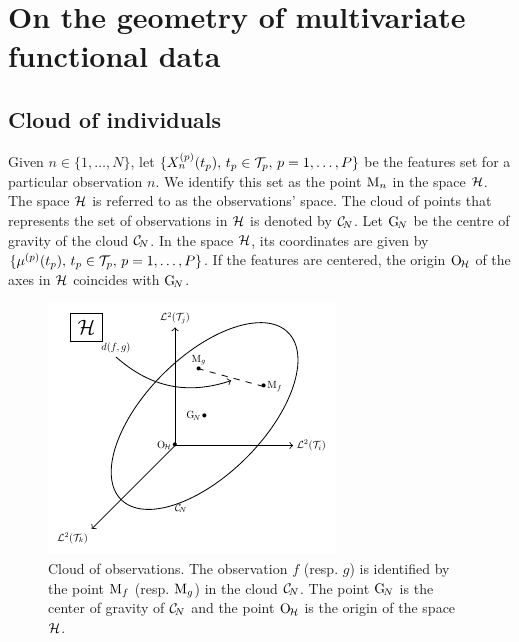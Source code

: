 \section{On the geometry of multivariate functional data} %
\label{sec:geometric_point_of_view_mfpca}

\subsection{Cloud of individuals} %
\label{sub:cloud_of_individuals}

Given $n \in \{1, \dots, N\}$, let $\{X_n^{(p)}(t_p),\,t_p \in \mathcal{T}_{p},\,p = 1, \dots, P\}$ be the features set for a particular observation $n$. We identify this set as the point $\mathrm{M}_n$ in the space $\mathcal{H}$. The space $\mathcal{H}$ is referred to as the observations' space. The cloud of points that represents the set of observations in $\mathcal{H}$ is denoted by $\mathcal{C}_{\!N}$. Let $\mathrm{G}_{\!N}$ be the centre of gravity of the cloud $\mathcal{C}_{\!N}$. In the space $\mathcal{H}$, its coordinates are given by $\{\mu^{(p)}(t_p),\,t_p \in \mathcal{T}_{p},\,p = 1, \dots, P\}$. If the features are centered, the origin $\mathrm{O}_{\!\mathcal{H}}$ of the axes in $\mathcal{H}$ coincides with $\mathrm{G}_{\!N}$.

\begin{figure}
    \centering
    \includegraphics[scale=1.2]{figures/cloud_obs.pdf}
    \caption{Cloud of observations. The observation $f$ (resp. $g$) is identified by the point $\mathrm{M}_f$ (resp. $\mathrm{M}_g$) in the cloud $\mathcal{C}_{\!N}$. The point $\mathrm{G}_{\!N}$ is the center of gravity of $\mathcal{C}_{\!N}$ and the point $\mathrm{O}_{\!\mathcal{H}}$ is the origin of the space $\mathcal{H}$.}
    \label{fig:cloud_obs}
\end{figure}

